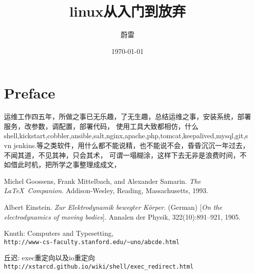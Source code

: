 \documentclass[11pt,a4paper]{book}
\title{linux从入门到放弃}
\author{蔚雷}
\date{\today}
\begin{document}
\maketitle

\tableofcontents 

\mainmatter

\chapter*{Preface}

运维工作四五年，所做之事已无乐趣，了无生趣，总结运维之事，安装系统，部署服务，改参数，调配置，部署代码，
使用工具大致都相仿，什么shell,kickstart,cobbler,ansible,salt,nginx,apache,php,tomcat,keepalived,mysql,git,svn
jenkins.等之类软件，用什么都不能说精，也不能说不会，昏昏沉沉一年过去，不闻其道，不见其神，只会其术，
可谓一塌糊涂，这样下去无非是浪费时间，不如借此时机，把所学之事整理成成文，





%

\begin{thebibliography}{9}
Michel Goossens, Frank Mittelbach, and Alexander Samarin. 
\textit{The \LaTeX\ Companion}. 
Addison-Wesley, Reading, Massachusetts, 1993.
 
Albert Einstein. 
\textit{Zur Elektrodynamik bewegter K{\"o}rper}. (German) 
[\textit{On the electrodynamics of moving bodies}]. 
Annalen der Physik, 322(10):891–921, 1905.
 
Knuth: Computers and Typesetting,
\\\texttt{http://www-cs-faculty.stanford.edu/\~{}uno/abcde.html}

	丘迟: exec重定向以及io重定向
	\\\texttt{http://xstarcd.github.io/wiki/shell/exec_redirect.html}

\end{thebibliography}
\end{document}

